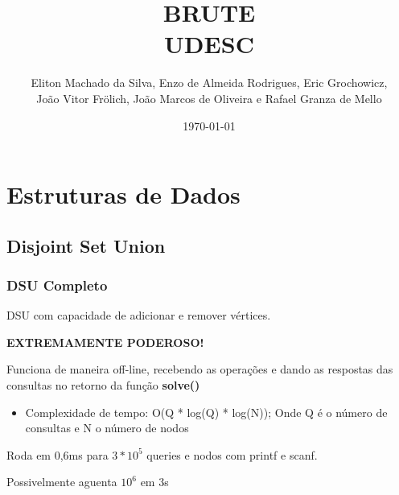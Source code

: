 \documentclass[11pt, a4paper, oneside]{book}
\title{BRUTE \\ UDESC}
\author{Eliton Machado da Silva, Enzo de Almeida Rodrigues, Eric Grochowicz, \\ João Vitor Frölich, João Marcos de Oliveira e Rafael Granza de Mello}
\begin{document}
\date{\today}
\maketitle

\renewcommand{\contentsname}{Índice} %

\tableofcontents
\newpage

%
%
%
%

\chapter{Estruturas de Dados}

\section{Disjoint Set Union}
\subsection{DSU Completo}


DSU com capacidade de adicionar e remover vértices.  



\textbf{EXTREMAMENTE PODEROSO!}  



Funciona de maneira off-line, recebendo as operações e dando as respostas das consultas no retorno da função \textbf{solve()}



\begin{itemize}
\item Complexidade de tempo: O(Q * log(Q) * log(N)); Onde Q é o número de consultas e N o número de nodos
\end{itemize}



Roda em 0,6ms para $3 * 10^5$ queries e nodos com printf e scanf.  

Possivelmente aguenta $10^6$ em 3s
\hfill
\end{document}
